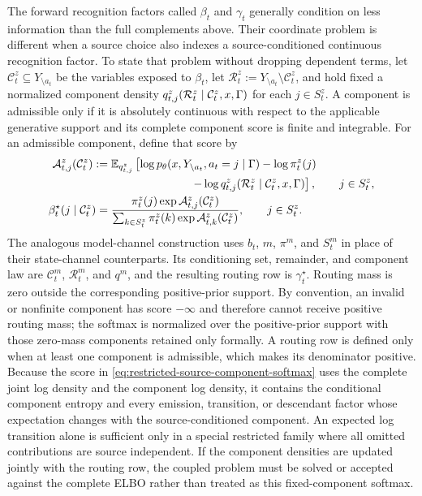 The forward recognition factors called $\beta_t$ and $\gamma_t$ generally condition on less information than the full complements above. Their coordinate problem is different when a source choice also indexes a source-conditioned continuous recognition factor. To state that problem without dropping dependent terms, let $\mathcal C_t^z\subseteq Y_{\setminus a_t}$ be the variables exposed to $\beta_t$, let $\mathcal R_t^z:=Y_{\setminus a_t}\setminus\mathcal C_t^z$, and hold fixed a normalized component density $q^z_{t,j}(\mathcal R_t^z\mid\mathcal C_t^z,x,\Gamma)$ for each $j\in S_t^z$. A component is admissible only if it is absolutely continuous with respect to the applicable generative support and its complete component score is finite and integrable. For an admissible component, define that score by
\begin{equation}
\begin{aligned}
\mathcal A^z_{t,j}(\mathcal C_t^z)
:={}&\mathbb E_{q^z_{t,j}}
\left[
\log p_\theta
(x,Y_{\setminus a_t},a_t=j\mid\Gamma)
-\log\pi_t^z(j)
\right.\\
&\left.\hspace{7em}
-\log q^z_{t,j}
(\mathcal R_t^z\mid\mathcal C_t^z,x,\Gamma)
\right],
\qquad j\in S_t^z,\\
\beta_t^\star(j\mid\mathcal C_t^z)
={}&
\frac{
\pi_t^z(j)\exp\mathcal A^z_{t,j}(\mathcal C_t^z)
}{
\sum_{k\in S_t^z}
\pi_t^z(k)\exp\mathcal A^z_{t,k}(\mathcal C_t^z)
},
\qquad j\in S_t^z.
\end{aligned}
\label{eq:restricted-source-component-softmax}
\end{equation}
The analogous model-channel construction uses $b_t$, $m$, $\pi^m$, and $S_t^m$ in place of their state-channel counterparts. Its conditioning set, remainder, and component law are $\mathcal C_t^m$, $\mathcal R_t^m$, and $q^m$, and the resulting routing row is $\gamma_t^\star$. Routing mass is zero outside the corresponding positive-prior support. By convention, an invalid or nonfinite component has score $-\infty$ and therefore cannot receive positive routing mass; the softmax is normalized over the positive-prior support with those zero-mass components retained only formally. A routing row is defined only when at least one component is admissible, which makes its denominator positive. Because the score in \cref{eq:restricted-source-component-softmax} uses the complete joint log density and the component log density, it contains the conditional component entropy and every emission, transition, or descendant factor whose expectation changes with the source-conditioned component. An expected log transition alone is sufficient only in a special restricted family where all omitted contributions are source independent. If the component densities are updated jointly with the routing row, the coupled problem must be solved or accepted against the complete ELBO rather than treated as this fixed-component softmax.

